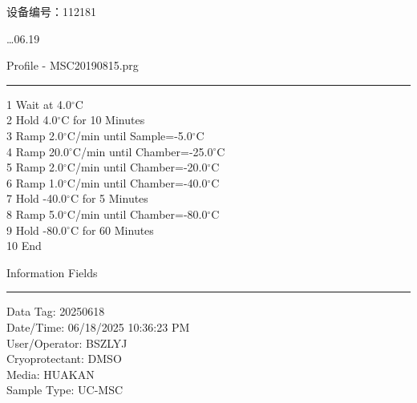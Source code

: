\documentclass[UTF8,10pt,a4paper,fontset=fandol]{ctexart}
\newcommand{\fieldvalue}[1]{#1}
\newcommand{\handwritten}[1]{#1}
\begin{document}
\noindent
\handwritten{设备编号：112181}

\noindent
\handwritten{\ldots 06.19}

\vspace{4pt}

\begin{center}
\end{center}

\vspace{4pt}

\begin{minipage}[t]{0.45\linewidth}
\centering
Profile -
\fieldvalue{MSC20190815.prg}

\rule{\linewidth}{0.4pt}

\raggedright
1 Wait at 4.0$^\circ$C\\
2 Hold 4.0$^\circ$C for 10 Minutes\\
3 Ramp 2.0$^\circ$C/min until Sample=-5.0$^\circ$C\\
4 Ramp 20.0$^\circ$C/min until Chamber=-25.0$^\circ$C\\
5 Ramp 2.0$^\circ$C/min until Chamber=-20.0$^\circ$C\\
6 Ramp 1.0$^\circ$C/min until Chamber=-40.0$^\circ$C\\
7 Hold -40.0$^\circ$C for 5 Minutes\\
8 Ramp 5.0$^\circ$C/min until Chamber=-80.0$^\circ$C\\
9 Hold -80.0$^\circ$C for 60 Minutes\\
10 End
\end{minipage}
\hfill
\begin{minipage}[t]{0.45\linewidth}
\centering
Information Fields

\rule{\linewidth}{0.4pt}

\raggedright
Data Tag:
\fieldvalue{20250618}
\\
Date/Time:
\fieldvalue{06/18/2025 10:36:23 PM}
\\
User/Operator:
\fieldvalue{BSZLYJ}
\\
Cryoprotectant:
\fieldvalue{DMSO}
\\
Media:
\fieldvalue{HUAKAN}
\\
Sample Type:
\fieldvalue{UC-MSC}
\end{minipage}
\end{document}
